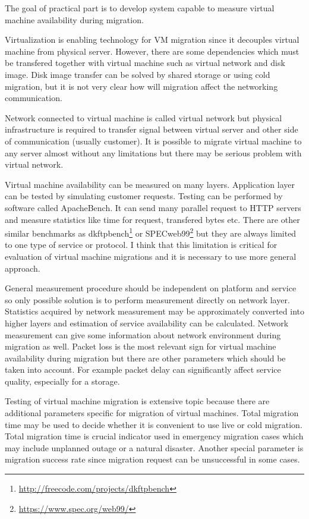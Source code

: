 
The goal of practical part is to develop system capable to measure virtual machine availability during migration. 

Virtualization is enabling technology for \Ac{VM} migration since it decouples virtual machine from physical server. However, there are some dependencies which must be transfered together with virtual machine such as virtual network and disk image. Disk image transfer can be solved by shared storage or using cold migration, but it is not very clear how will migration affect the networking communication.

Network connected to virtual machine is called virtual network but physical infrastructure is required to transfer signal between virtual server and other side of communication (usually customer). It is possible to migrate virtual machine to any server almost without any limitations but there may be serious problem with virtual network. 

Virtual machine availability can be measured on many layers. Application layer can be tested by simulating customer requests. Testing can be performed by software called ApacheBench. It can send many parallel request to \Ac{HTTP} servers and measure statistics like time for request, transfered bytes etc. 
There are other similar benchmarks as dkftpbench\footnote{\url{http://freecode.com/projects/dkftpbench}} or SPECweb99\footnote{\url{https://www.spec.org/web99/}} but they are always limited to one type of service or protocol. I think that this limitation is critical for evaluation of virtual machine migrations and it is necessary to use more general approach.

General measurement procedure should be independent on platform and service so only possible solution is to perform measurement directly on network layer. Statistics acquired by network measurement may be approximately converted into higher layers and estimation of service availability can be calculated. Network measurement can give some information about network environment during migration as well. Packet loss is the most relevant sign for virtual machine availability during migration but there are other parameters which should be taken into account. For example packet delay can significantly affect service quality, especially for a storage.

Testing of virtual machine migration is extensive topic because there are additional parameters specific for migration of virtual machines. Total migration time may be used to decide whether it is convenient to use live or cold migration. Total migration time is crucial indicator used in emergency migration cases which may include unplanned outage or a natural disaster. Another special parameter is migration success rate since migration request can be unsuccessful in some cases.

